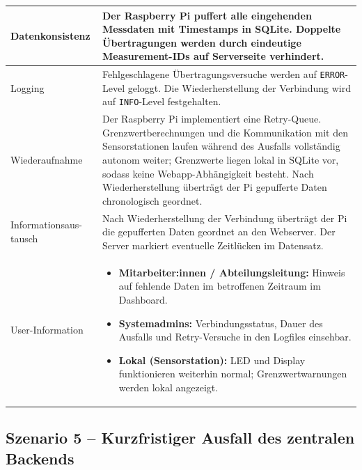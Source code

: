 \documentclass[12pt,a4paper]{article}
\begin{document}
    \begin{tabularx}{\linewidth}{L X}
    \toprule
    Datenkonsistenz &
    Der Raspberry Pi puffert alle eingehenden Messdaten mit Timestamps in SQLite.
    Doppelte Übertragungen werden durch eindeutige Measurement-IDs auf Serverseite
    verhindert. \\
    \midrule
    Logging &
    Fehlgeschlagene Übertragungsversuche werden auf \texttt{ERROR}-Level geloggt.
    Die Wiederherstellung der Verbindung wird auf \texttt{INFO}-Level festgehalten. \\
    \midrule
    Wiederaufnahme &
    Der Raspberry Pi implementiert eine Retry-Queue.
    Grenzwertberechnungen und die Kommunikation mit den Sensorstationen laufen
    während des Ausfalls vollständig autonom weiter; Grenzwerte liegen lokal in SQLite vor,
    sodass keine Webapp-Abhängigkeit besteht.
    Nach Wiederherstellung überträgt der Pi gepufferte Daten chronologisch geordnet. \\
    \midrule
    Informationsaus-
    tausch &
    Nach Wiederherstellung der Verbindung überträgt der Pi die gepufferten Daten
    geordnet an den Webserver.
    Der Server markiert eventuelle Zeitlücken im Datensatz. \\
    \midrule
    User-Information &
    \begin{minipage}[t]{\linewidth}
        \begin{itemize}[leftmargin=1.2em, itemsep=2pt, topsep=0pt]
            \item \textbf{Mitarbeiter:innen / Abteilungsleitung:} Hinweis auf fehlende Daten
            im betroffenen Zeitraum im Dashboard.
            \item \textbf{Systemadmins:} Verbindungsstatus, Dauer des Ausfalls und
            Retry-Versuche in den Logfiles einsehbar.
            \item \textbf{Lokal (Sensorstation):} LED und Display funktionieren weiterhin
            normal; Grenzwertwarnungen werden lokal angezeigt.
        \end{itemize}
    \end{minipage} \\
    \bottomrule
    \end{tabularx}


    \subsection{Szenario 5 – Kurzfristiger Ausfall des zentralen Backends}
\end{document}
